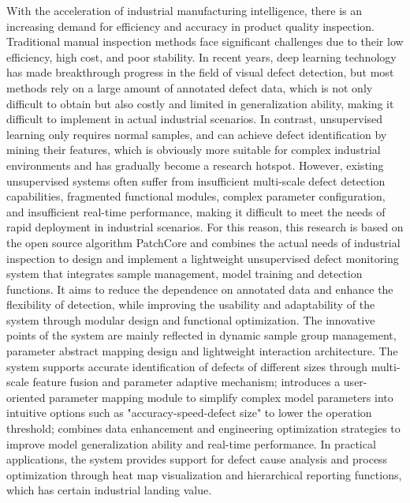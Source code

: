 \documentclass[
  ]{njuthesis}
\begin{document}
\begin{abstract*}
With the acceleration of industrial manufacturing intelligence, there is an increasing demand for efficiency and accuracy in product quality inspection. Traditional manual inspection methods face significant challenges due to their low efficiency, high cost, and poor stability. In recent years, deep learning technology has made breakthrough progress in the field of visual defect detection, but most methods rely on a large amount of annotated defect data, which is not only difficult to obtain but also costly and limited in generalization ability, making it difficult to implement in actual industrial scenarios. In contrast, unsupervised learning only requires normal samples, and can achieve defect identification by mining their features, which is obviously more suitable for complex industrial environments and has gradually become a research hotspot. However, existing unsupervised systems often suffer from insufficient multi-scale defect detection capabilities, fragmented functional modules, complex parameter configuration, and insufficient real-time performance, making it difficult to meet the needs of rapid deployment in industrial scenarios. For this reason, this research is based on the open source algorithm PatchCore and combines the actual needs of industrial inspection to design and implement a lightweight unsupervised defect monitoring system that integrates sample management, model training and detection functions. It aims to reduce the dependence on annotated data and enhance the flexibility of detection, while improving the usability and adaptability of the system through modular design and functional optimization. The innovative points of the system are mainly reflected in dynamic sample group management, parameter abstract mapping design and lightweight interaction architecture. The system supports accurate identification of defects of different sizes through multi-scale feature fusion and parameter adaptive mechanism; introduces a user-oriented parameter mapping module to simplify complex model parameters into intuitive options such as "accuracy-speed-defect size" to lower the operation threshold; combines data enhancement and engineering optimization strategies to improve model generalization ability and real-time performance. In practical applications, the system provides support for defect cause analysis and process optimization through heat map visualization and hierarchical reporting functions, which has certain industrial landing value.
\end{abstract*}
\end{document}
